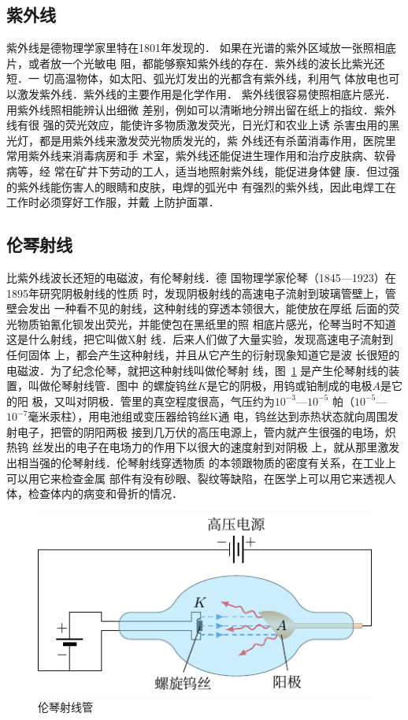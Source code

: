 \subsection{紫外线}

紫外线是德物理学家里特在1801年发现的．
如果在光谱的紫外区域放一张照相底片，或者放一个光敏电
阻，都能够察知紫外线的存在．紫外线的波长比紫光还短．一
切高温物体，如太阳、弧光灯发出的光都含有紫外线，利用气
体放电也可以激发紫外线．紫外线的主要作用是化学作用．
紫外线很容易使照相底片感光．用紫外线照相能辨认出细微
差别，例如可以清晰地分辨出留在纸上的指纹．紫外线有很
强的荧光效应，能使许多物质激发荧光，日光灯和农业上诱
杀害虫用的黑光灯，都是用紫外线来激发荧光物质发光的，紫
外线还有杀菌消毒作用，医院里常用紫外线来消毒病房和手
术室，紫外线还能促进生理作用和治疗皮肤病、软骨病等，经
常在矿井下劳动的工人，适当地照射紫外线，能促进身体健
康．但过强的紫外线能伤害人的眼睛和皮肤，电焊的弧光中
有强烈的紫外线，因此电焊工在工作时必须穿好工作服，并戴
上防护面罩．

\subsection{伦琴射线}
比紫外线波长还短的电磁波，有伦琴射线．德
国物理学家伦琴（1845—1923）在1895年研究阴极射线的性质
时，发现阴极射线的高速电子流射到玻璃管壁上，管壁会发出
一种看不见的射线，这种射线的穿透本领很大，能使放在厚纸
后面的荧光物质铂氰化钡发出荧光，并能使包在黑纸里的照
相底片感光，伦琴当时不知道这是什么射线，把它叫做X射
线．后来人们做了大量实验，发现高速电子流射到任何固体
上，都会产生这种射线，并且从它产生的衍射现象知道它是波
长很短的电磁波．为了纪念伦琴，就把这种射线叫做伦琴射
线，图~\ref{fig_C_6-16} 是产生伦琴射线的装置，叫做伦琴射线管．图中
的螺旋钨丝$K$是它的阴极，用钨或铂制成的电极$A$是它的阳
极，又叫对阴极．管里的真空程度很高，气压约为$10^{-3}$—$10^{-5}$
帕（$10^{-5}$—$10^{-7}$毫米汞柱），用电池组或变压器给钨丝K通
电，钨丝达到赤热状态就向周围发射电子，把管的阴阳两极
接到几万伏的高压电源上，管内就产生很强的电场，炽热钨
丝发出的电子在电场力的作用下以很大的速度射到对阴极
上，就从那里激发出相当强的伦琴射线．伦琴射线穿透物质
的本领跟物质的密度有关系，在工业上可以用它来检查金属
部件有没有砂眼、裂纹等缺陷，在医学上可以用它来透视人
体，检查体内的病变和骨折的情况．
\begin{figure}[htbp]
    \centering
    \includegraphics{fig/C/6-16.pdf}
    \caption{伦琴射线管}\label{fig_C_6-16}
\end{figure}

